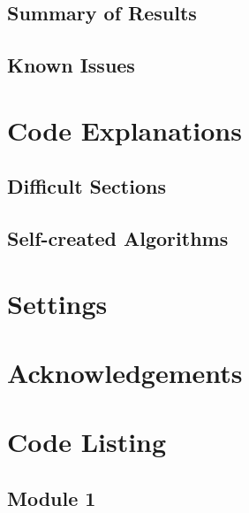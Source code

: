 \subsection{Summary of Results}

\subsection{Known Issues}

\section{Code Explanations}

\subsection{Difficult Sections}

\subsection{Self-created Algorithms}

\section{Settings}

\section{Acknowledgements}

\section{Code Listing}
\begin{landscape}
\subsection{Module 1}
\begin{comment}
\pythonfile[firstline=5]{./tex/function_programs/print_function.py}
\end{comment}
\end{landscape}

